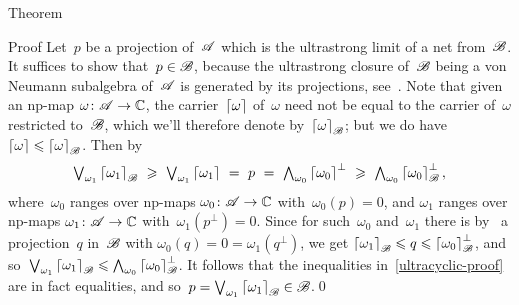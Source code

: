 \documentclass[a]{subfiles}
\begin{document}
\begin{parsec}
\begin{point}[vnsac]{Theorem}
\begin{point}{Proof}
Let~$p$ be a projection of~$\mathscr{A}$ which is the ultrastrong limit
of a net from~$\mathscr{B}$. It suffices to show that~$p\in\mathscr{B}$,
because the ultrastrong closure of~$\mathscr{B}$
being a von Neumann subalgebra of~$\mathscr{A}$
is generated by its projections, see~.
Note that given an np-map $\omega\colon \mathscr{A}\to\mathbb{C}$,
the carrier~$\left\lceil\omega\right\rceil$ of~$\omega$
need not be equal to the carrier
of~$\omega$ restricted to~$\mathscr{B}$,
which we'll therefore denote by~$\left\lceil\omega\right\rceil_{\mathscr{B}}$;
but we do have $\left\lceil\omega\right\rceil\leqslant \left\lceil\omega\right\rceil_{\mathscr{B}}$.
Then by~
\begin{equation}
\label{ultracyclic-proof}
\textstyle
\bigvee_{\omega_1}
\ceil{\omega_1}_\scrB \ \geq\ 
\bigvee_{\omega_1}
\ceil{\omega_1}\ =\ p\ =\ 
\bigwedge_{\omega_0} \ceil{\omega_0}^\perp
\ \geq\ \bigwedge_{\omega_0} \ceil{\omega_0}_{\scrB}^\perp,
\end{equation}
where~$\omega_0$ ranges over np-maps $\omega_0\colon \mathscr{A}\to\mathbb{C}$
with~$\omega_0(p)=0$,
 and $\omega_1$ ranges over
np-maps $\omega_1\colon \mathscr{A}\to\mathbb{C}$ with~$\omega_1(p^\perp)=0$.
Since for such~$\omega_0$ and~$\omega_1$
there is 
by~
a projection~$q$ in~$\mathscr{B}$
with $\omega_0(q)=0=\omega_1(q^\perp)$,
we get 
$\left\lceil\omega_1\right\rceil_{\mathscr{B}} \leqslant q \leqslant 
\left\lceil\omega_0\right\rceil_{\mathscr{B}}^\perp$,
and so~$\bigvee_{\omega_1} \left\lceil\omega_1\right\rceil_{\mathscr{B}}
\leqslant 
\bigwedge_{\omega_0} \left\lceil\omega_0\right\rceil_{\mathscr{B}}^\perp$.
It follows that the inequalities in~\eqref{ultracyclic-proof}
are in fact equalities,
and so~$p=\bigvee_{\omega_1}\left\lceil\omega_1\right\rceil_{\mathscr{B}} \in \mathscr{B}$.\qed
\end{point}
\end{point}
\end{parsec}
\end{document}
